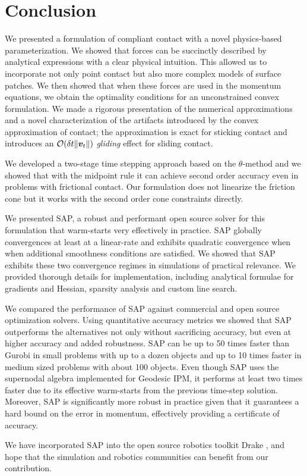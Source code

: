 \section{Conclusion}
\label{sec:future_directions}

We presented a formulation of compliant contact with a novel physics-based
parameterization. We showed that forces can be succinctly described by analytical
expressions with a clear physical intuition. This allowed us to incorporate not
only point contact but also more complex models of surface patches. We then showed
that when these forces are used in the momentum equations, we obtain the
optimality conditions for an unconstrained convex formulation. We made a
rigorous presentation of the numerical approximations and a novel
characterization of the artifacts introduced by the convex approximation of
contact; the approximation is exact for sticking contact and introduces an
$\mathcal{O}(\delta t\|{\bm{v}}_t\|)$ \emph{gliding} effect for sliding contact.

We developed a two-stage time stepping approach based on the
$\theta\text{-method}$ and we showed that with the midpoint rule it can achieve
second order accuracy even in problems with frictional contact. Our formulation
does not linearize the friction cone but it works with the second order cone
constraints directly.

We presented SAP, a robust and performant open source solver for this formulation that
warm-starts very effectively in practice. SAP 
globally convergences at least at a linear-rate and exhibits quadratic convergence when when additional smoothness conditions are satisfied. We showed that SAP
exhibits these two convergence regimes in simulations of practical relevance. We
provided thorough details for implementation, including analytical
formulae for gradients and Hessian, sparsity analysis and custom line search.

We compared the performance of SAP against commercial and open source
optimization solvers. Using quantitative accuracy metrics we showed that SAP
outperforms the alternatives not only without sacrificing accuracy, but even at
higher accuracy and added robustness. SAP can be up to 50 times faster than
Gurobi in small problems with up to a dozen objects and up to 10 times faster in
medium sized problems with about 100 objects. Even though SAP uses the
supernodal algebra implemented for Geodesic IPM, it performs at least two times
faster due to its effective warm-starts from the previous time-step
solution. Moreover, SAP is significantly more robust in practice given
that it guarantees a hard bound on the error in momentum, effectively providing
a certificate of accuracy.

We have incorporated SAP into the open source robotics toolkit Drake
\cite{bib:drake}, and hope that the simulation and robotics communities can
benefit from our contribution.

